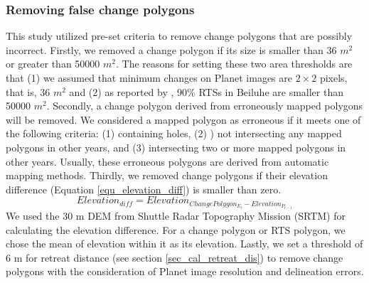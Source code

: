 \documentclass[authoryear,preprint,review,12pt]{elsarticle}
\begin{document}
\subsubsection{Removing false change polygons}
\label{sec_removing_false_change}

This study utilized pre-set criteria to remove change polygons that are possibly incorrect. 
Firstly, we removed a change polygon if its size is smaller than 36 $m^2$ or greater than 50000 $m^2$. 
The reasons for setting these two area thresholds are that (1) we assumed that minimum changes on Planet images are $2\times2$ pixels, that is, 36 $m^2$ and (2) as reported by \cite{huang2020using}, 90\% RTSs in Beiluhe are smaller than 50000 $m^2$. 
Secondly, a change polygon derived from erroneously mapped polygons will be removed.
We considered a mapped polygon as erroneous if it meets one of the following criteria: (1) containing holes, (2) ) not intersecting any mapped polygons in other years, and (3) intersecting two or more mapped polygons in other years.
Usually, these erroneous polygons are derived from automatic mapping methods. 
Thirdly, we removed change polygons if their elevation difference (Equation \ref{equ_elevation_diff}) is smaller than zero. 
\begin{equation}
Elevation_{diff}=Elevation_{ChangePolygon_{E_{t}} -  Elevation_{P_{t-1}}}
\label{equ_elevation_diff}
\end{equation}
We used the 30 m DEM from Shuttle Radar Topography Mission (SRTM) \citep{farr2007shuttle} for calculating the elevation difference. 
For a change polygon or RTS polygon, we chose the mean of elevation within it as its elevation. 
Lastly, we set a threshold of 6 m for retreat distance (see section \ref{sec_cal_retreat_dis}) to remove change polygons with the consideration of Planet image resolution and delineation errors. 
\end{document}
